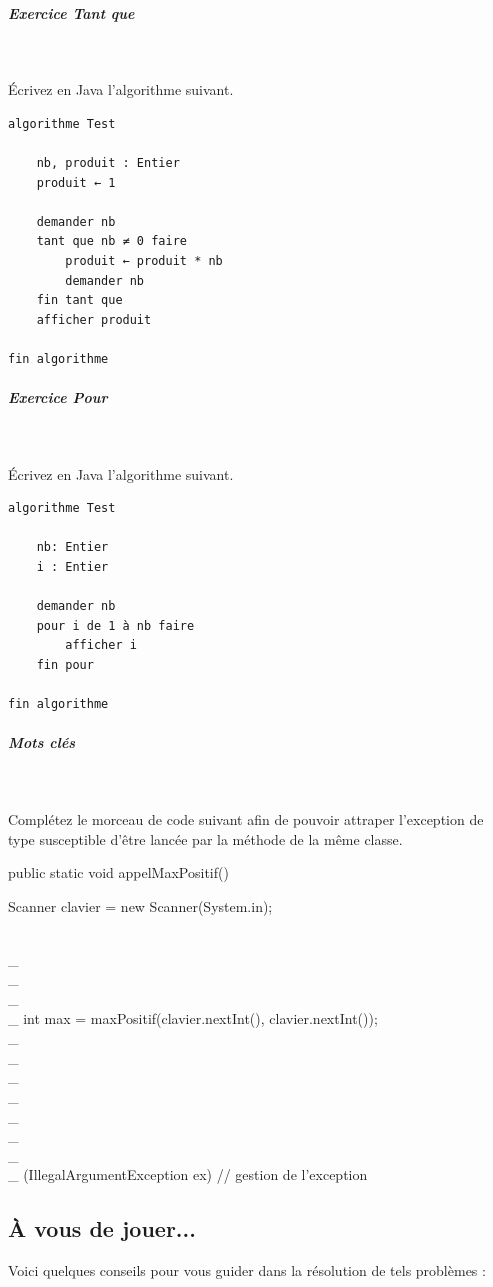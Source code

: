 \documentclass[11pt,a4paper]{article}
\begin{document}
		\subparagraph{Exercice Tant que} 
		
					\textcolor{white}{.} \par
				
					\'Ecrivez en Java l'algorithme suivant.
				
            \par
        \begin{verbatim}
algorithme Test

    nb, produit : Entier
    produit ← 1 

    demander nb
    tant que nb ≠ 0 faire
        produit ← produit * nb
        demander nb 
    fin tant que
    afficher produit
    
fin algorithme
			    \end{verbatim}
			
		\subparagraph{Exercice Pour} 
		
					\textcolor{white}{.} \par
				
					\'Ecrivez en Java l'algorithme suivant.
				
            \par
        \begin{verbatim}
algorithme Test

    nb: Entier
    i : Entier

    demander nb
    pour i de 1 à nb faire
        afficher i
    fin pour

fin algorithme
			     \end{verbatim}
			
		\subparagraph{Mots cl\'es} 
		
                \textcolor{white}{.} \par
            
							Compl\'etez le morceau de code suivant afin de pouvoir attraper l'exception de type \verb@IllegalArgumentException@ 
							susceptible d'\^etre lanc\'ee par la m\'ethode \verb@maxPositif@ de la m\^eme classe.
						\clearpage\begin{Java}
public static void appelMaxPositif() {

    Scanner clavier = new Scanner(System.in);
    
     \\_\\_\\_\\_  {
        int max = maxPositif(clavier.nextInt(), clavier.nextInt());
    }  \\_\\_\\_\\_\\_\\_\\_\\_  (IllegalArgumentException ex) {
        // gestion de l'exception
    }
    
}
							\end{Java}\subsection{\`A vous de jouer...}
          Voici quelques conseils pour vous guider dans la r\'esolution de tels probl\`emes :
          
\end{document}
